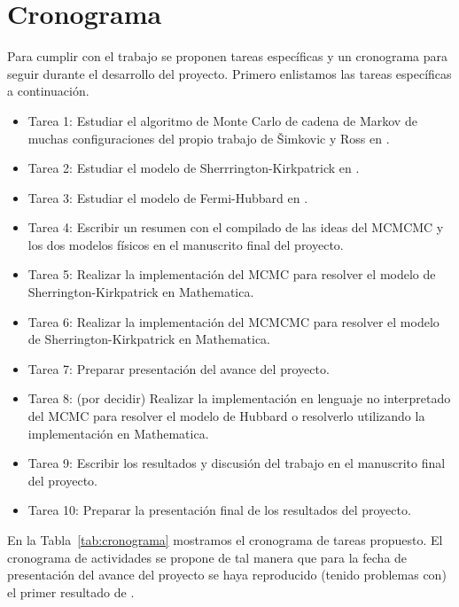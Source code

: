 \documentclass[letterpaper,superscriptaddress,aps,pra,nolongbibliography,twocolumn,showpacs,floatfix,10pt]{revtex4-2} %
\renewcommand{\>}{\rangle}
\newcommand{\<}{\langle}
\newcommand{\Tref}[1]{Tabla~\ref{#1}}
\newcommand{\syr}{Šimkovic y Ross}
\begin{document}
\section{Cronograma} %
Para cumplir con el trabajo se proponen tareas específicas y un cronograma 
para seguir durante el desarrollo del proyecto. Primero enlistamos las tareas
específicas a continuación. 
\begin{itemize}
\item Tarea 1: Estudiar el algoritmo de Monte Carlo de cadena de Markov 
de muchas configuraciones del propio trabajo de \syr{} en \cite{simkovic2021manyconfiguration}.
\item Tarea 2: Estudiar el modelo de Sherrrington-Kirkpatrick en \cite{panchenko2012sherrington}.
\item Tarea 3: Estudiar el modelo de Fermi-Hubbard en \cite{hirsch1985two,white1989numerical}.
\item Tarea 4: Escribir un resumen con el compilado de las ideas del MCMCMC
y los dos modelos físicos en el manuscrito final del proyecto.
\item Tarea 5: Realizar la implementación del MCMC para resolver el modelo
de Sherrington-Kirkpatrick en Mathematica.
\item Tarea 6: Realizar la implementación del MCMCMC para resolver el modelo
de Sherrington-Kirkpatrick en Mathematica.
\item Tarea 7: Preparar presentación del avance del proyecto.
\item Tarea 8: (por decidir) Realizar la implementación en lenguaje no interpretado
del MCMC para resolver el modelo de Hubbard o resolverlo utilizando la 
implementación en Mathematica.
\item Tarea 9: Escribir los resultados y discusión del trabajo en el manuscrito
final del proyecto. 
\item Tarea 10: Preparar la presentación final de los resultados del proyecto.
\end{itemize}

En la \Tref{tab:cronograma} mostramos el cronograma de tareas propuesto. 
El cronograma de actividades se propone de tal manera que para la fecha de
presentación del avance del proyecto se haya reproducido (tenido problemas con)
el primer resultado de \cite{simkovic2021manyconfiguration}.
\end{document}
